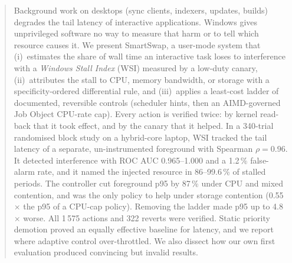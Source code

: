 \begin{abstract}
Background work on desktops (sync clients, indexers, updates, builds) degrades the tail latency of interactive applications. Windows gives unprivileged software no way to measure that harm or to tell which resource causes it. We present SmartSwap, a user-mode system that (i)~estimates the share of wall time an interactive task loses to interference with a \emph{Windows Stall Index} (WSI) measured by a low-duty canary, (ii)~attributes the stall to CPU, memory bandwidth, or storage with a specificity-ordered differential rule, and (iii)~applies a least-cost ladder of documented, reversible controls (scheduler hints, then an AIMD-governed Job Object CPU-rate cap). Every action is verified twice: by kernel read-back that it took effect, and by the canary that it helped. In a 340-trial randomised block study on a hybrid-core laptop, WSI tracked the tail latency of a separate, un-instrumented foreground with Spearman $\rho=0.96$. It detected interference with ROC AUC 0.965--1.000 and a 1.2\,\% false-alarm rate, and it named the injected resource in 86--99.6\,\% of stalled periods. The controller cut foreground p95 by 87\,\% under CPU and mixed contention, and was the only policy to help under storage contention (0.55$\times$ the p95 of a CPU-cap policy). Removing the ladder made p95 up to 4.8$\times$ worse. All 1\,575 actions and 322 reverts were verified. Static priority demotion proved an equally effective baseline for latency, and we report where adaptive control over-throttled. We also dissect how our own first evaluation produced convincing but invalid results.
\end{abstract}
